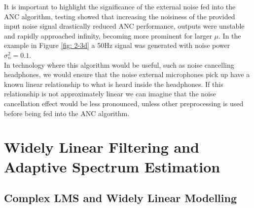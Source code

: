 \documentclass[12pt]{article}
\begin{document}
			It is important to highlight the significance of the external noise fed into the ANC algorithm, testing showed that increasing the noisiness of the provided input noise signal drastically reduced ANC performance, outputs were unstable and rapidly approached infinity, becoming more prominent for larger $\mu$. In the example in Figure \ref{fig: 2-3d} a 50Hz signal was generated with noise power $\sigma_n^{ 2}=0.1$.\\
			 In technology where this algorithm would be useful, such as noise cancelling headphones, we would ensure that the noise external microphones pick up have a known linear relationship to what is heard inside the headphones. If this relationship is not approximately linear we can imagine that the noise cancellation effect would be less pronounced, unless other preprocessing is used before being fed into the ANC algorithm.
	
\pagebreak
\section{Widely Linear Filtering and Adaptive Spectrum Estimation} \label{sec: 3-WLASE}
	\subsection{Complex LMS and Widely Linear Modelling} \label{sec: 3-1-CLMS-ACLMS}
\end{document}

